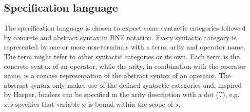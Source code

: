 \documentclass{article}
\begin{document}
\subsection{Specification language}

The specification language is chosen to expect some syntactic categories followed by concrete and abstract syntax in BNF notation.  %
Every syntactic category is represented by one or more non-terminals with a term, arity and operator name. The term might refer to other syntactic categories or its own. Each term is the concrete syntax of an operator, while the arity, in combination with the operator name, is a concise representation of the abstract syntax of an operator. 
The abstract syntax only makes use of the defined syntactic categories and, inspired by Harper\cite{harper}, binders can be specified in the arity description with a dot ('.'), e.g. $x.s$ specifies that variable $x$ is bound within the scope of $s$.


\end{document}
